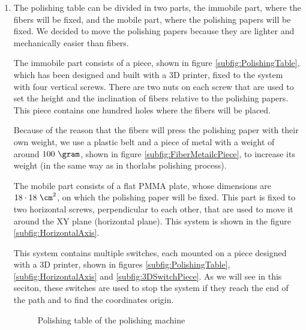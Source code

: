 \begin{enumerate}
\item{} The polishing table can be divided in two parts, the immobile part, where the fibers will be fixed, and the mobile part, where the polishing papers will be fixed. We decided to move the polishing papers because they are lighter and mechanically easier than fibers.

The immobile part consists of a piece, shown in figure \ref{subfig:PolishingTable}, which has been designed and built with a 3D printer, fixed to the system with four vertical screws. There are two nuts on each screw that are used to set the height and the inclination of fibers relative to the polishing papers. This piece contains one hundred holes where the fibers will be placed. 

Because of the reason that the fibers will press the polishing paper with their own weight, we use a plastic belt and a piece of metal with a weight of around $100~\gram$, shown in figure \ref{subfig:FiberMetailcPiece}, to increase its weight (in the same way as in thorlabs polishing process).

The mobile part consists of a flat PMMA plate, whose dimensions are $18 \cdot{} 18~\cm^2$, on which the polishing paper will be fixed. This part is fixed to two horizontal screws, perpendicular to each other, that are used to move it around the XY plane (horizontal plane). This system is shown in the figure \ref{subfig:HorizontalAxis}.

This system contains multiple switches, each mounted on a piece designed with a 3D printer, shown in figures \ref{subfig:PolishingTable}, \ref{subfig:HorizontalAxis} and \ref{subfig:3DSwitchPiece}. As we will see in this seciton, these switches are used to stop the system if they reach the end of the path and to find the coordinates origin.

\begin{figure}[htbp]
 \centering
    \newline
 \caption{Polishing table of the polishing machine}
 \label{fig:PolishingTable}
\end{figure}


\end{enumerate}
